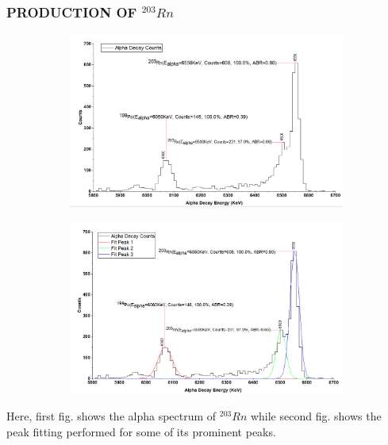 \documentclass[12pt]{article}
\begin{document}
\subsubsection{PRODUCTION OF $^{203}Rn$}
\begin{figure}[h]
\centering
 \begin{subfigure}
\centering
\includegraphics[scale=0.49]{Rn203.png}
\end{subfigure}
\hfill
\begin{subfigure}
\centering
\includegraphics[scale=0.49]{Rn203(Peak Fitting).png}
\end{subfigure}
\label{First fig shows the alpha spectrum of Rn 203 and second fig shows the peak fitting for its prominent peaks.}
\end{figure}
Here, first fig. shows the alpha spectrum of $^{203}Rn$ while second fig. shows the peak fitting performed for some of its prominent peaks.
\clearpage
\end{document}
